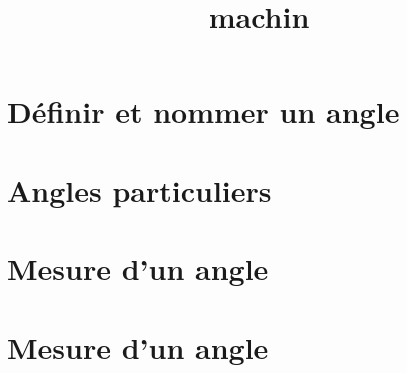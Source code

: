 \documentclass[12pt,a4paper]{article}
\date{}
\title{machin}
\begin{document}
%
%

%

%
%
%
%
%
%
%
%
\section{Définir et nommer un angle}



\section{Angles particuliers}



\section{Mesure d'un angle}



\setcounter{section}{2}

\section{Mesure d'un angle}


\end{document}
